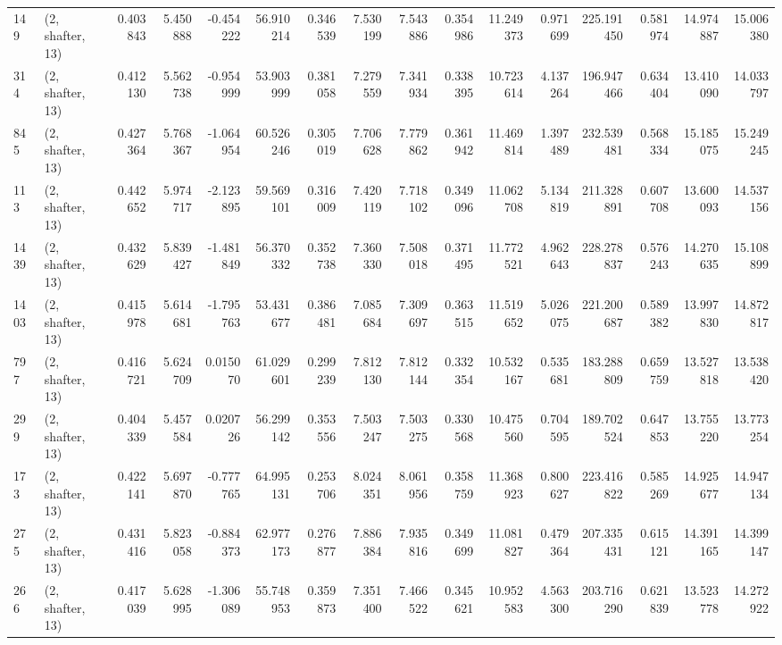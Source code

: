 \begin{tabular}{llrrrrrrrrrrrrrr}
149  &  (2, shafter, 13) &   0.403843 &   5.450888 &  -0.454222 &     56.910214 &    0.346539 &    7.530199 &    7.543886 &  0.354986 &  11.249373 &   0.971699 &   225.191450 &   0.581974 &  14.974887 &  15.006380 \\
314  &  (2, shafter, 13) &   0.412130 &   5.562738 &  -0.954999 &     53.903999 &    0.381058 &    7.279559 &    7.341934 &  0.338395 &  10.723614 &   4.137264 &   196.947466 &   0.634404 &  13.410090 &  14.033797 \\
845  &  (2, shafter, 13) &   0.427364 &   5.768367 &  -1.064954 &     60.526246 &    0.305019 &    7.706628 &    7.779862 &  0.361942 &  11.469814 &   1.397489 &   232.539481 &   0.568334 &  15.185075 &  15.249245 \\
113  &  (2, shafter, 13) &   0.442652 &   5.974717 &  -2.123895 &     59.569101 &    0.316009 &    7.420119 &    7.718102 &  0.349096 &  11.062708 &   5.134819 &   211.328891 &   0.607708 &  13.600093 &  14.537156 \\
1439 &  (2, shafter, 13) &   0.432629 &   5.839427 &  -1.481849 &     56.370332 &    0.352738 &    7.360330 &    7.508018 &  0.371495 &  11.772521 &   4.962643 &   228.278837 &   0.576243 &  14.270635 &  15.108899 \\
1403 &  (2, shafter, 13) &   0.415978 &   5.614681 &  -1.795763 &     53.431677 &    0.386481 &    7.085684 &    7.309697 &  0.363515 &  11.519652 &   5.026075 &   221.200687 &   0.589382 &  13.997830 &  14.872817 \\
797  &  (2, shafter, 13) &   0.416721 &   5.624709 &   0.015070 &     61.029601 &    0.299239 &    7.812130 &    7.812144 &  0.332354 &  10.532167 &   0.535681 &   183.288809 &   0.659759 &  13.527818 &  13.538420 \\
299  &  (2, shafter, 13) &   0.404339 &   5.457584 &   0.020726 &     56.299142 &    0.353556 &    7.503247 &    7.503275 &  0.330568 &  10.475560 &   0.704595 &   189.702524 &   0.647853 &  13.755220 &  13.773254 \\
173  &  (2, shafter, 13) &   0.422141 &   5.697870 &  -0.777765 &     64.995131 &    0.253706 &    8.024351 &    8.061956 &  0.358759 &  11.368923 &   0.800627 &   223.416822 &   0.585269 &  14.925677 &  14.947134 \\
275  &  (2, shafter, 13) &   0.431416 &   5.823058 &  -0.884373 &     62.977173 &    0.276877 &    7.886384 &    7.935816 &  0.349699 &  11.081827 &   0.479364 &   207.335431 &   0.615121 &  14.391165 &  14.399147 \\
266  &  (2, shafter, 13) &   0.417039 &   5.628995 &  -1.306089 &     55.748953 &    0.359873 &    7.351400 &    7.466522 &  0.345621 &  10.952583 &   4.563300 &   203.716290 &   0.621839 &  13.523778 &  14.272922 \\

\end{tabular}
